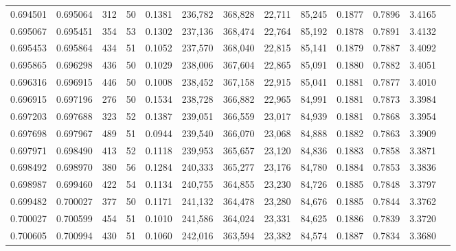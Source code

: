 \begin{tabular}{rrrrrrrrrrrrr}
0.694501 & 0.695064 &   312 &  50 &                                     0.1381 & 236,782 & 368,828 &  22,711 &  85,245 & 0.1877 & 0.7896 & 3.4165 \\
0.695067 & 0.695451 &   354 &  53 &                                     0.1302 & 237,136 & 368,474 &  22,764 &  85,192 & 0.1878 & 0.7891 & 3.4132 \\
0.695453 & 0.695864 &   434 &  51 &                                     0.1052 & 237,570 & 368,040 &  22,815 &  85,141 & 0.1879 & 0.7887 & 3.4092 \\
0.695865 & 0.696298 &   436 &  50 &                                     0.1029 & 238,006 & 367,604 &  22,865 &  85,091 & 0.1880 & 0.7882 & 3.4051 \\
0.696316 & 0.696915 &   446 &  50 &                                     0.1008 & 238,452 & 367,158 &  22,915 &  85,041 & 0.1881 & 0.7877 & 3.4010 \\
0.696915 & 0.697196 &   276 &  50 &                                     0.1534 & 238,728 & 366,882 &  22,965 &  84,991 & 0.1881 & 0.7873 & 3.3984 \\
0.697203 & 0.697688 &   323 &  52 &                                     0.1387 & 239,051 & 366,559 &  23,017 &  84,939 & 0.1881 & 0.7868 & 3.3954 \\
0.697698 & 0.697967 &   489 &  51 &                                     0.0944 & 239,540 & 366,070 &  23,068 &  84,888 & 0.1882 & 0.7863 & 3.3909 \\
0.697971 & 0.698490 &   413 &  52 &                                     0.1118 & 239,953 & 365,657 &  23,120 &  84,836 & 0.1883 & 0.7858 & 3.3871 \\
0.698492 & 0.698970 &   380 &  56 &                                     0.1284 & 240,333 & 365,277 &  23,176 &  84,780 & 0.1884 & 0.7853 & 3.3836 \\
0.698987 & 0.699460 &   422 &  54 &                                     0.1134 & 240,755 & 364,855 &  23,230 &  84,726 & 0.1885 & 0.7848 & 3.3797 \\
0.699482 & 0.700027 &   377 &  50 &                                     0.1171 & 241,132 & 364,478 &  23,280 &  84,676 & 0.1885 & 0.7844 & 3.3762 \\
0.700027 & 0.700599 &   454 &  51 &                                     0.1010 & 241,586 & 364,024 &  23,331 &  84,625 & 0.1886 & 0.7839 & 3.3720 \\
0.700605 & 0.700994 &   430 &  51 &                                     0.1060 & 242,016 & 363,594 &  23,382 &  84,574 & 0.1887 & 0.7834 & 3.3680 \\

\end{tabular}
